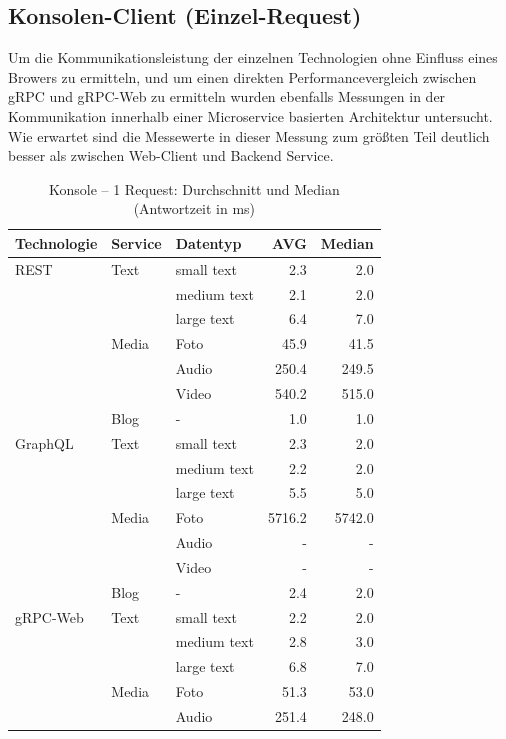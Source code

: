 \clearpage
\subsection{Konsolen-Client (Einzel-Request)}
Um die Kommunikationsleistung der einzelnen Technologien ohne Einfluss eines Browers zu ermitteln, und um einen direkten Performancevergleich zwischen gRPC und gRPC-Web zu ermitteln wurden ebenfalls Messungen in der Kommunikation innerhalb einer Microservice basierten Architektur untersucht. Wie erwartet sind die Messewerte in dieser Messung zum größten Teil deutlich besser als zwischen Web-Client und Backend Service.  

\begin{table}[h]
	\centering
	\caption{Konsole – 1 Request: Durchschnitt und Median (Antwortzeit in ms)}
	\label{tab:console-1req}
	\renewcommand{\arraystretch}{1.1}
	\begin{tabular}{|l|l|l|r|r|}
		\hline
		\textbf{Technologie} & \textbf{Service} & \textbf{Datentyp} & \textbf{AVG} & \textbf{Median} \\
		\hline
		REST & Text  & small text  & 2.3 & 2.0 \\
		&       & medium text & 2.1 & 2.0 \\
		&       & large text  & 6.4 & 7.0 \\
		& Media & Foto        & 45.9 & 41.5 \\
		&       & Audio       & 250.4 & 249.5 \\
		&       & Video       & 540.2 & 515.0 \\
		& Blog  & -           & 1.0 & 1.0 \\
		\hline
		GraphQL & Text  & small text  & 2.3 & 2.0 \\
		&       & medium text & 2.2 & 2.0 \\
		&       & large text  & 5.5 & 5.0 \\
		& Media & Foto        & 5716.2 & 5742.0 \\
		&       & Audio       & - & - \\
		&       & Video       & - & - \\
		& Blog  & -           & 2.4 & 2.0 \\
		\hline
		gRPC-Web & Text  & small text  & 2.2 & 2.0 \\
		&       & medium text & 2.8 & 3.0 \\
		&       & large text  & 6.8 & 7.0 \\
		& Media & Foto        & 51.3 & 53.0 \\
		&       & Audio       & 251.4 & 248.0 \\

\end{tabular}
\end{table}
